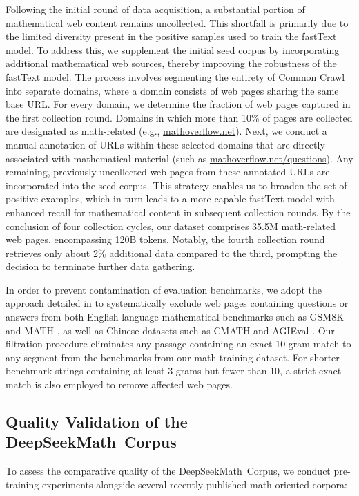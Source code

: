 Following the initial round of data acquisition, a substantial portion of mathematical web content remains uncollected. This shortfall is primarily due to the limited diversity present in the positive samples used to train the fastText model. To address this, we supplement the initial seed corpus by incorporating additional mathematical web sources, thereby improving the robustness of the fastText model. The process involves segmenting the entirety of Common Crawl into separate domains, where a domain consists of web pages sharing the same base URL. For every domain, we determine the fraction of web pages captured in the first collection round. Domains in which more than 10\% of pages are collected are designated as math-related (e.g., \url{mathoverflow.net}). Next, we conduct a manual annotation of URLs within these selected domains that are directly associated with mathematical material (such as \url{mathoverflow.net/questions}). Any remaining, previously uncollected web pages from these annotated URLs are incorporated into the seed corpus. This strategy enables us to broaden the set of positive examples, which in turn leads to a more capable fastText model with enhanced recall for mathematical content in subsequent collection rounds. By the conclusion of four collection cycles, our dataset comprises 35.5M math-related web pages, encompassing 120B tokens. Notably, the fourth collection round retrieves only about 2\% additional data compared to the third, prompting the decision to terminate further data gathering.

In order to prevent contamination of evaluation benchmarks, we adopt the approach detailed in \cite{deepseek-coder} to systematically exclude web pages containing questions or answers from both English-language mathematical benchmarks such as GSM8K \citep{gsm8k} and MATH \citep{MATH}, as well as Chinese datasets such as CMATH \citep{wei2023cmath} and AGIEval \citep{agieval}. Our filtration procedure eliminates any passage containing an exact 10-gram match to any segment from the benchmarks from our math training dataset. For shorter benchmark strings containing at least 3 grams but fewer than 10, a strict exact match is also employed to remove affected web pages.

\subsection{Quality Validation of the DeepSeekMath~Corpus}

To assess the comparative quality of the DeepSeekMath~Corpus, we conduct pre-training experiments alongside several recently published math-oriented corpora:

